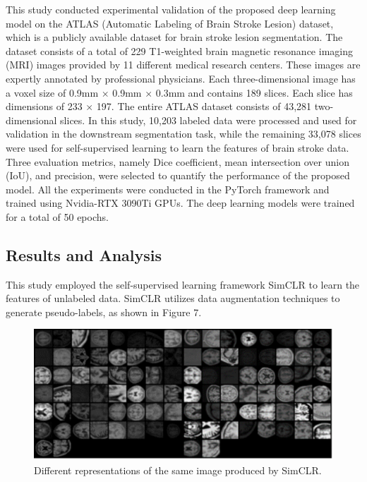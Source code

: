 \documentclass[10pt,twocolumn,letterpaper]{article}
\begin{document}
This study conducted experimental validation of the proposed deep learning model on the ATLAS (Automatic Labeling of Brain Stroke Lesion) dataset, which is a publicly available dataset for brain stroke lesion segmentation. The dataset consists of a total of 229 T1-weighted brain magnetic resonance imaging (MRI) images provided by 11 different medical research centers. These images are expertly annotated by professional physicians. Each three-dimensional image has a voxel size of 0.9mm × 0.9mm × 0.3mm and contains 189 slices. Each slice has dimensions of 233 × 197. The entire ATLAS dataset consists of 43,281 two-dimensional slices. In this study, 10,203 labeled data were processed and used for validation in the downstream segmentation task, while the remaining 33,078 slices were used for self-supervised learning to learn the features of brain stroke data.
Three evaluation metrics, namely Dice coefficient, mean intersection over union (IoU), and precision, were selected to quantify the performance of the proposed model.
All the experiments were conducted in the PyTorch framework and trained using Nvidia-RTX 3090Ti GPUs. The deep learning models were trained for a total of 50 epochs.

\subsection{Results and Analysis}

This study employed the self-supervised learning framework SimCLR to learn the features of unlabeled data. SimCLR utilizes data augmentation techniques to generate pseudo-labels, as shown in Figure 7.

\begin{figure}
  \begin{center}
  \includegraphics{Images/DR_SimCLR.png}
  \end{center}
     \caption{Different representations of the same image produced by SimCLR.}
  \label{fig:dr_simclr}
\end{figure}
\end{document}
